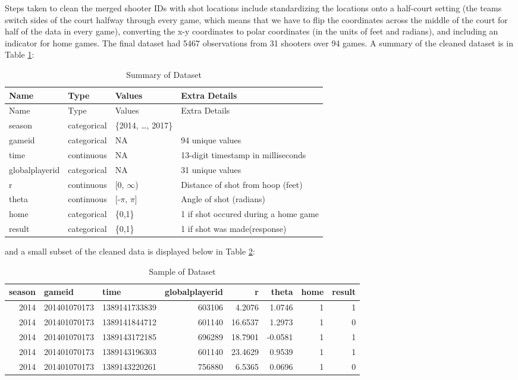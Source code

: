 \documentclass[12pt,twoside]{dukestatscithesis}
\theoremstyle{definition}
\theoremstyle{definition}
\theoremstyle{definition}
\theoremstyle{remark}
\begin{document}
Steps taken to clean the merged shooter IDs with shot locations include
standardizing the locations onto a half-court setting (the teams switch
sides of the court halfway through every game, which means that we have
to flip the coordinates across the middle of the court for half of the
data in every game), converting the x-y coordinates to polar coordinates
(in the units of feet and radians), and including an indicator for home
games. The final dataset had 5467 observations from 31 shooters over 94
games. A summary of the cleaned dataset is in Table
\ref{tab:summarytable}:
\begin{longtable}[]{@{}llll@{}}
\caption{\label{tab:summarytable}Summary of Dataset}\tabularnewline
\toprule
Name & Type & Values & Extra Details\tabularnewline
\midrule
\endfirsthead
\toprule
Name & Type & Values & Extra Details\tabularnewline
\midrule
\endhead
season & categorical & \{2014, \ldots{}, 2017\} &\tabularnewline
gameid & categorical & NA & 94 unique values\tabularnewline
time & continuous & NA & 13-digit timestamp in
milliseconds\tabularnewline
globalplayerid & categorical & NA & 31 unique values\tabularnewline
r & continuous & {[}0, \(\infty\)) & Distance of shot from hoop
(feet)\tabularnewline
theta & continuous & {[}-\(\pi\), \(\pi\){]} & Angle of shot
(radians)\tabularnewline
home & categorical & \{0,1\} & 1 if shot occured during a home
game\tabularnewline
result & categorical & \{0,1\} & 1 if shot was
made(response)\tabularnewline
\bottomrule
\end{longtable}
and a small subset of the cleaned data is displayed below in Table
\ref{tab:sampletable}:

\begingroup\fontsize{11}{13}\selectfont
\begin{longtable}[t]{rllrrrrr}
\caption[Data Sample]{\label{tab:sampletable}Sample of Dataset}\\
\toprule
season & gameid & time & globalplayerid & r & theta & home & result\\
\midrule
2014 & 201401070173 & 1389141733839 & 603106 & 4.2076 & 1.0746 & 1 & 1\\
2014 & 201401070173 & 1389141844712 & 601140 & 16.6537 & 1.2973 & 1 & 0\\
2014 & 201401070173 & 1389143172185 & 696289 & 18.7901 & -0.0581 & 1 & 1\\
2014 & 201401070173 & 1389143196303 & 601140 & 23.4629 & 0.9539 & 1 & 1\\
2014 & 201401070173 & 1389143220261 & 756880 & 6.5365 & 0.0696 & 1 & 0\\
\bottomrule
\end{longtable}
\endgroup{}
\end{document}
